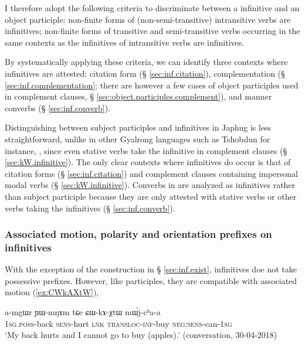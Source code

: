 I therefore adopt the following criteria to discriminate between a  infinitive and an object participle:   non-finite forms of (non-semi-transitive) intransitive verbs are infinitives;  non-finite forms of transitive and semi-transitive verbs occurring in the same contexts as the infinitives of intransitive verbs are infinitives.

By systematically applying these criteria, we can identify three contexts where infinitives are attested: citation form (§ \ref{sec:inf.citation}), complementation (§ \ref{sec:inf.complementation}; there are however a few cases of object participles used in complement clauses, § \ref{sec:object.participles.complement}), and manner converbs (§ \ref{sec:inf.converb}). 

Distinguishing between subject participles and  infinitives in Japhug is less straightforward, unlike in other Gyalrong languages such as Tshobdun for instance, \citealt{jackson14morpho}, since even stative verbs take the  infinitive in complement clauses (§ \ref{sec:kW.infinitive}). The only clear contexts where  infinitives do occur is that of citation forms (§ \ref{sec:inf.citation}) and complement clauses containing impersonal modal verbs (§ \ref{sec:kW.infinitive}). Converbs in  are analyzed as infinitives rather than subject participle because they are only attested with stative verbs or other verbs taking the  infinitives (§ \ref{sec:inf.converb}).

\subsubsection{Associated motion, polarity and orientation prefixes on infinitives}  \label{sec:infinitives.other.prefixes}
With the exception of the construction in § \ref{sec:inf.exist},  infinitives doe not take possessive prefixes. However, like participles, they are compatible with associated motion (\ref{ex:CWkAXtW}), 

\begin{exe}
\ex \label{ex:CWkAXtW}
\gll a-mgɯr ɲɯ-mŋɤm tɕe ɕɯ-kɤ-χtɯ mɯ́j-cʰa-a \\
\textsc{1sg}.\textsc{poss}-back \textsc{sens}-hurt \textsc{lnk} \textsc{transloc}-\textsc{inf}-buy \textsc{neg}:\textsc{sens}-can-\textsc{1sg} \\
\glt `My back hurts and I cannot go to  buy (apples).' (conversation, 30-04-2018)
\end{exe}

